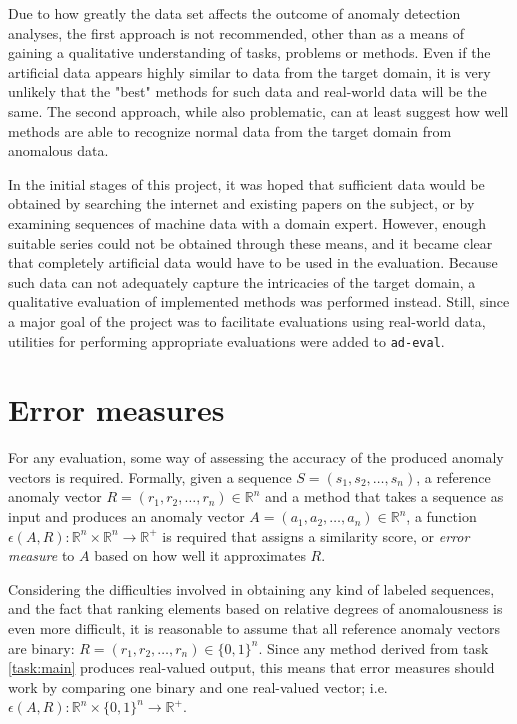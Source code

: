 Due to how greatly the data set affects the outcome of anomaly detection analyses, the first approach is not recommended, other than as a means of gaining a qualitative understanding of tasks, problems or methods. Even if the artificial data appears highly similar to data from the target domain, it is very unlikely that the "best" methods for such data and real-world data will be the same. The second approach, while also problematic, can at least suggest how well methods are able to recognize normal data from the target domain from anomalous data.

In the initial stages of this project, it was hoped that sufficient data would be obtained by searching the internet and existing papers on the subject, or by examining sequences of machine data with a domain expert. However, enough suitable series could not be obtained through these means, and it became clear that completely artificial data would have to be used in the evaluation. Because such data can not adequately capture the intricacies of the target domain, a qualitative evaluation of implemented methods was performed instead. Still, since a major goal of the project was to facilitate evaluations using real-world data, utilities for performing appropriate evaluations were added to \texttt{ad-eval}.
 
\section{Error measures}
\label{sect:evaluation_measures}

For any evaluation, some way of assessing the accuracy of the produced anomaly vectors is required. Formally, given a sequence $S = (s_1, s_2, \dots, s_n)$, a reference anomaly vector $R = (r_1, r_2, \dots, r_n) \in \mathbb{R}^{n}$ and a method that takes a sequence as input and produces an anomaly vector $A = (a_1, a_2, \dots, a_n) \in \mathbb{R}^{n}$, a function $\epsilon(A, R): \mathbb{R}^n \times \mathbb{R}^n \rightarrow \mathbb{R}^+$ is required that assigns a similarity score, or \emph{error measure} to $A$ based on how well it approximates $R$.

Considering the difficulties involved in obtaining any kind of labeled sequences, and the fact that ranking elements based on relative degrees of anomalousness is even more difficult, it is reasonable to assume that all reference anomaly vectors are binary: $R = (r_1, r_2, \dots, r_n) \in \{0,1\}^n$. Since any method derived from task \ref{task:main} produces real-valued output, this means that error measures should work by comparing one binary and one real-valued vector; i.e. $\epsilon(A, R): \mathbb{R}^{n} \times \{0,1\}^n \rightarrow \mathbb{R}^+$.

